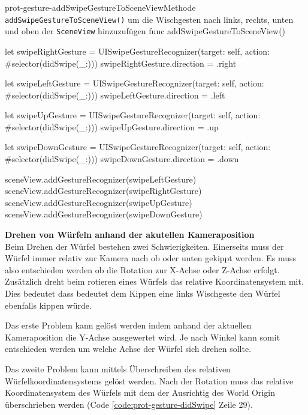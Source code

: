 \begin{description}
    \begin{code}{prot-gesture-addSwipeGestureToSceneView}{Methode \texttt{addSwipeGestureToSceneView()} um die Wischgesten nach links, rechts, unten und oben der \texttt{SceneView} hinzuzufügen}
        func addSwipeGestureToSceneView() {
            let swipeRightGesture = UISwipeGestureRecognizer(target: self, action: #selector(didSwipe(_:)))
            swipeRightGesture.direction = .right
            
            let swipeLeftGesture = UISwipeGestureRecognizer(target: self, action: #selector(didSwipe(_:)))
            swipeLeftGesture.direction = .left
            
            let swipeUpGesture = UISwipeGestureRecognizer(target: self, action: #selector(didSwipe(_:)))
            swipeUpGesture.direction = .up
            
            let swipeDownGesture = UISwipeGestureRecognizer(target: self, action: #selector(didSwipe(_:)))
            swipeDownGesture.direction = .down
            
            sceneView.addGestureRecognizer(swipeLeftGesture)
            sceneView.addGestureRecognizer(swipeRightGesture)
            sceneView.addGestureRecognizer(swipeUpGesture)
            sceneView.addGestureRecognizer(swipeDownGesture)
        }
    \end{code}

    \textbf{Drehen von Würfeln anhand der akutellen Kameraposition}\\
    Beim Drehen der Würfel bestehen zwei Schwierigkeiten. Einerseits muss der Würfel immer relativ zur Kamera nach ob oder unten gekippt werden. Es muss also entschieden werden ob die Rotation zur X-Achse oder Z-Achse erfolgt. Zusätzlich dreht beim rotieren eines Würfels das relative Koordinatensystem mit. Dies bedeutet dass bedeutet dem Kippen eine links Wischgeste den Würfel ebenfalls kippen würde.

    Das erste Problem kann gelöst werden indem anhand der aktuellen Kameraposition die Y-Achse ausgewertet wird. Je nach Winkel kann somit entschieden werden um welche Achse der Würfel sich drehen sollte. %

    Das zweite Problem kann mittels Überschreiben des relativen Würfelkoordinatensystems gelöst werden. Nach der Rotation muss das relative Koordinatensystem des Würfels mit dem der Ausrichtig des World Origin überschrieben werden (Code \ref{code:prot-gesture-didSwipe} Zeile 29).


\end{description}

